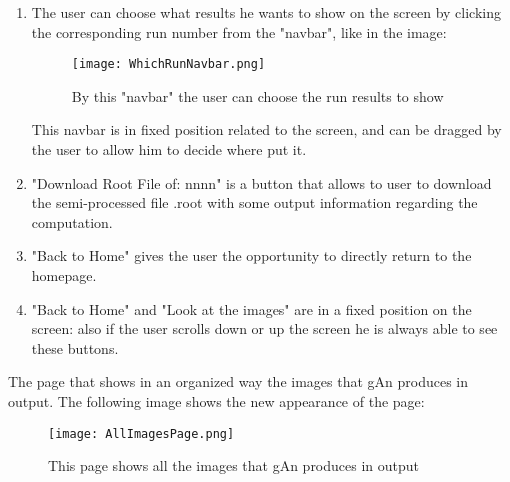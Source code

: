 \begin{enumerate}
\item The user can choose what results he wants to show on the screen by clicking the corresponding run number from the "navbar", like in the image:

\begin{figure}[H]
\centering
\texttt{[image: WhichRunNavbar.png]} 
\caption{By this "navbar" the user can choose the run results to show}
\end{figure}

This navbar is in fixed position related to the screen, and can be dragged by the user to allow him to decide where put it.

\item "Download Root File of: nnnn" is a button that allows to user to download the semi-processed file .root with some output information regarding the computation.

\item "Back to Home" gives the user the opportunity to directly return to the homepage. 

\item "Back to Home" and "Look at the images" are in a fixed position on the screen: also if the user scrolls down or up the screen he is always able to see these buttons.    

\end{enumerate}
The page that shows in an organized way the images that gAn produces in output. The following image shows the new appearance of the page:



\begin{figure}[H]
\centering
\texttt{[image: AllImagesPage.png]} 
\caption{This page shows all the images that gAn produces in output}
\end{figure}


